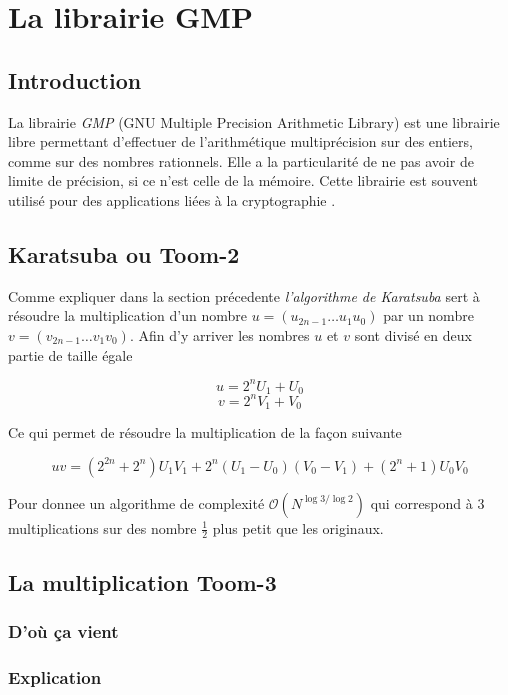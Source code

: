 \documentclass[letterpaper]{article}
\begin{document}
\section{La librairie GMP}
\subsection{Introduction}

La librairie \emph{GMP} (GNU Multiple Precision Arithmetic Library) est une
librairie libre permettant d'effectuer de l'arithmétique multiprécision sur
des entiers, comme sur des nombres rationnels. Elle a la particularité de ne pas
avoir de limite de précision, si ce n'est celle de la mémoire.
\newline
Cette librairie est souvent utilisé pour des applications liées à la cryptographie
\cite{wikigmp}.

\subsection{Karatsuba ou Toom-2}

Comme expliquer dans la section précedente \emph{l'algorithme de Karatsuba} sert
à résoudre la multiplication d'un nombre $u = (u_{2n-1} \dots u_1 u_0)$ par un
nombre $v = (v_{2n-1} \dots v_1 v_0)$. Afin d'y arriver les nombres $u$ et $v$
sont divisé en deux partie de taille égale

  $$u = 2^{n} U_1 + U_0$$
  $$v = 2^{n} V_1 + V_0$$

Ce qui permet de résoudre la multiplication de la façon suivante

  $$uv = (2^{2n} + 2^n) U_1 V_1 + 2^n (U_1 - U_0) (V_0 - V_1) + (2^n + 1) U_0 V_0$$

Pour donnee un algorithme de complexité $\mathcal{O}(N^{\log{3}/\log{2}})$ qui
correspond à $3$ multiplications sur des nombre $\frac{1}{2}$ plus petit que
les originaux\cite{gmplibkaratsuba}.

\subsection{La multiplication Toom-3}

\subsubsection{D'où ça vient}

\subsubsection{Explication}
\end{document}
